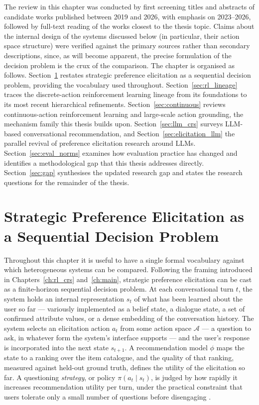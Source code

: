 The review in this chapter was conducted by first screening titles and abstracts of candidate works published between 2019 and 2026, with emphasis on 2023--2026, followed by full-text reading of the works closest to the thesis topic. Claims about the internal design of the systems discussed below (in particular, their action space structure) were verified against the primary sources rather than secondary descriptions, since, as will become apparent, the precise formulation of the decision problem is the crux of the comparison. The chapter is organised as follows. Section~\ref{sec:problem} restates strategic preference elicitation as a sequential decision problem, providing the vocabulary used throughout. Section~\ref{sec:rl_lineage} traces the discrete-action reinforcement learning lineage from its foundations to its most recent hierarchical refinements. Section~\ref{sec:continuous} reviews continuous-action reinforcement learning and large-scale action grounding, the mechanism family this thesis builds upon. Section~\ref{sec:llm_crs} surveys LLM-based conversational recommendation, and Section~\ref{sec:elicitation_llm} the parallel revival of preference elicitation research around LLMs. Section~\ref{sec:eval_norms} examines how evaluation practice has changed and identifies a methodological gap that this thesis addresses directly. Section~\ref{sec:gap} synthesises the updated research gap and states the research questions for the remainder of the thesis.

\section{Strategic Preference Elicitation as a Sequential Decision Problem}
\label{sec:problem}

Throughout this chapter it is useful to have a single formal vocabulary against which heterogeneous systems can be compared. Following the framing introduced in Chapters~\ref{ch:rl_crs} and~\ref{ch:main}, strategic preference elicitation can be cast as a finite-horizon sequential decision problem. At each conversational turn $t$, the system holds an internal representation $s_t$ of what has been learned about the user so far — variously implemented as a belief state, a dialogue state, a set of confirmed attribute values, or a dense embedding of the conversation history. The system selects an elicitation action $a_t$ from some action space $\mathcal{A}$ — a question to ask, in whatever form the system's interface supports — and the user's response is incorporated into the next state $s_{t+1}$. A recommendation model $\phi$ maps the state to a ranking over the item catalogue, and the quality of that ranking, measured against held-out ground truth, defines the utility of the elicitation so far. A questioning \textit{strategy}, or policy $\pi(a_t \mid s_t)$, is judged by how rapidly it increases recommendation utility per turn, under the practical constraint that users tolerate only a small number of questions before disengaging \citep{sun2018conversational, lei2020estimation}.

